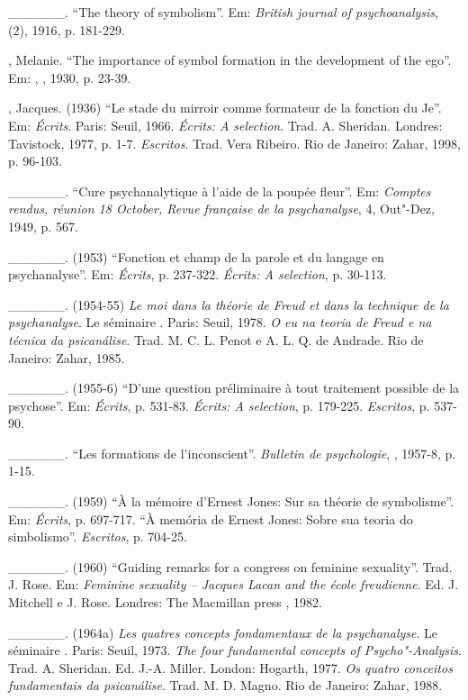 \begin{Parskip}
\_\_\_\_\_\_. ``The theory of symbolism''. Em: \emph{British journal of
psychoanalysis},  (2), 1916, p. 181-229.

, Melanie. ``The importance of symbol formation in the development of the
ego''. Em: \emph{}, , 1930, p. 23-39.

, Jacques. (1936) ``Le stade du mirroir comme formateur de la fonction du
Je''. Em: \emph{Écrits}. Paris: Seuil, 1966.
\emph{Écrits: A selection}. Trad. A. Sheridan. Londres: Tavistock, 1977, p. 1-7.
\emph{Escritos}. Trad. Vera Ribeiro. Rio de Janeiro: Zahar, 1998, p. 96-103.

\_\_\_\_\_\_. ``Cure psychanalytique à l'aide de la poupée fleur''. Em:
\emph{Comptes rendus, réunion 18 October, Revue française de la
psychanalyse}, 4, Out"-Dez, 1949, p. 567.

\_\_\_\_\_\_. (1953) ``Fonction et champ de la parole et du langage en
psychanalyse''. Em: \emph{Écrits}, p. 237-322. \emph{Écrits: A
selection}, p. 30-113.

\_\_\_\_\_\_. (1954-55) \emph{Le moi dans la théorie de Freud et dans la technique de
la psychanalyse}. Le séminaire . Paris: Seuil, 1978. \emph{O
eu na teoria de Freud e na técnica da psicanálise}. Trad. M. C. L.
Penot e A. L. Q. de Andrade. Rio de Janeiro: Zahar, 1985.

\_\_\_\_\_\_. (1955-6) ``D'une question préliminaire à tout traitement possible de la
psychose''. Em: \emph{Écrits}, p. 531-83. \emph{Écrits: A
selection}, p. 179-225. \emph{Escritos}, p. 537-90.

\_\_\_\_\_\_. ``Les formations de l'inconscient''. \emph{Bulletin de
psychologie}, , 1957-8, p. 1-15.

\_\_\_\_\_\_. (1959) ``À la mémoire d'Ernest Jones: Sur sa théorie de
symbolisme''. Em: \emph{Écrits}, p. 697-717. ``À memória de Ernest Jones: Sobre
sua teoria do simbolismo''. \emph{Escritos}, p. 704-25.

\_\_\_\_\_\_. (1960) ``Guiding remarks for a congress on feminine sexuality''.
Trad. J. Rose. Em: \emph{Feminine sexuality -- Jacques Lacan and the
école freudienne}. Ed. J. Mitchell e J. Rose.
Londres: The Macmillan press , 1982.

\_\_\_\_\_\_. (1964a) \emph{Les quatres concepts fondamentaux de la psychanalyse}.
Le séminaire . Paris: Seuil, 1973. \emph{The four
fundamental concepts of Psycho"-Analysis}. Trad. A. Sheridan. Ed.
J.-A. Miller. London: Hogarth, 1977. \emph{Os quatro conceitos
fundamentais da psicanálise}. Trad. M. D. Magno. Rio de Janeiro: Zahar, 1988.


\end{Parskip}
